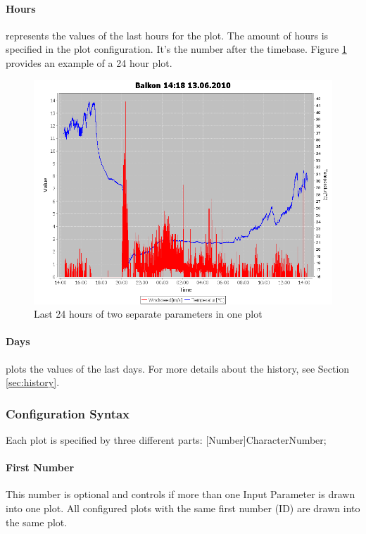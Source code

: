 \paragraph{Hours} %
\label{par:hours}
represents the values of the last hours for the plot. The amount of hours is specified in the plot configuration. It's the number after the timebase. Figure \ref{fig:hours} provides an example of a 24 hour plot.
\begin{figure}[ht]
    \centering
    \includegraphics[width=0.9\linewidth]{master/plot_exampleh.png}
    \caption{Last 24 hours of two separate parameters in one plot}
    \label{fig:hours}
\end{figure}

\paragraph{Days} %
\label{par:days}
plots the values of the last days. For more details about the history, see Section \ref{sec:history}.

\subsubsection{Configuration Syntax} %
\label{ssub:configuration_syntax}
Each plot is specified by three different parts: [Number]CharacterNumber;

\paragraph{First Number} %
\label{par:first_number_id}
This number is optional and controls if more than one Input Parameter is drawn into one plot. All configured plots with the same first number (ID) are drawn into the same plot.
